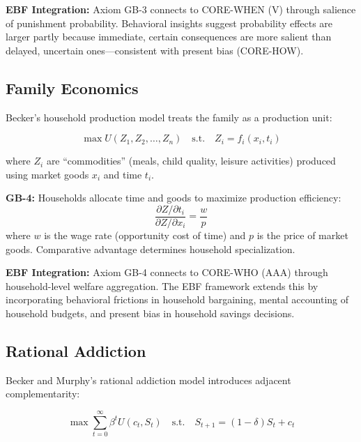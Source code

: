 \textbf{EBF Integration:} Axiom GB-3 connects to CORE-WHEN (V) through salience of punishment probability. Behavioral insights suggest probability effects are larger partly because immediate, certain consequences are more salient than delayed, uncertain ones---consistent with present bias (CORE-HOW).

\subsection{Family Economics}
\label{subsec:gb-family}

Becker's household production model \citep{becker1965theory, becker1981treatise} treats the family as a production unit:

\begin{equation}
\max U(Z_1, Z_2, \ldots, Z_n) \quad \text{s.t.} \quad Z_i = f_i(x_i, t_i)
\label{eq:gb-household}
\end{equation}

where $Z_i$ are ``commodities'' (meals, child quality, leisure activities) produced using market goods $x_i$ and time $t_i$.

\begin{axiom}
\label{ax:gb-4}
\textbf{GB-4:} Households allocate time and goods to maximize production efficiency:
\begin{equation}
\frac{\partial Z/\partial t_i}{\partial Z/\partial x_i} = \frac{w}{p}
\end{equation}
where $w$ is the wage rate (opportunity cost of time) and $p$ is the price of market goods. Comparative advantage determines household specialization.
\end{axiom}

\textbf{EBF Integration:} Axiom GB-4 connects to CORE-WHO (AAA) through household-level welfare aggregation. The EBF framework extends this by incorporating behavioral frictions in household bargaining, mental accounting of household budgets, and present bias in household savings decisions.

\subsection{Rational Addiction}
\label{subsec:gb-addiction}

Becker and Murphy's rational addiction model \citep{PAP-becker1988theory} introduces adjacent complementarity:

\begin{equation}
\max \sum_{t=0}^{\infty} \beta^t U(c_t, S_t) \quad \text{s.t.} \quad S_{t+1} = (1-\delta)S_t + c_t
\label{eq:gb-addiction}
\end{equation}

